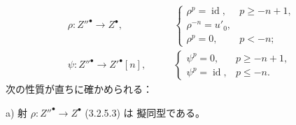\begin{equation}
\begin{aligned}
\rho\colon Z''^\bullet\longrightarrow Z^\bullet,
&\qquad
\begin{cases}
\rho^p=\operatorname{id},&p\geq -n+1,\\
\rho^{-n}=u'_0,&\\
\rho^p=0,&p<-n;
\end{cases}\\[3pt]
\psi\colon Z''^\bullet\longrightarrow {Z'}^\bullet[n],
&\qquad
\begin{cases}
\psi^p=0,&p\geq -n+1,\\
\psi^p=\operatorname{id},&p\leq -n.
\end{cases}
\end{aligned}
\tag{3.2.5.3}
\end{equation}
次の性質が直ちに確かめられる：

\noindent a) 射
$\rho\colon Z''^\bullet\longrightarrow Z^\bullet$ (3.2.5.3) は
擬同型である。
\endgroup
